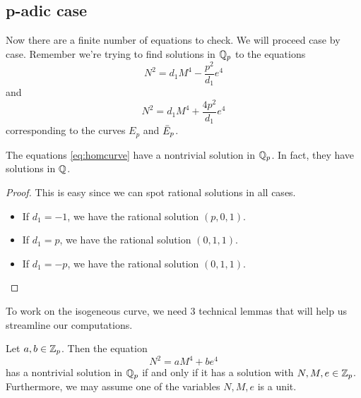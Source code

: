 \documentclass[12pt, a4paper]{report}
\begin{document}
\subsection{p-adic case}
Now there are a finite number of equations to check. We will proceed case by
case. Remember we're trying to find solutions in ${\mathbb Q}_p$ to the equations
\begin{equation} \label{eq:homcurve}
  N^2 = d_1 M^4 - \frac{p^2}{d_1}e^4
\end{equation}
and
\begin{equation} \label{eq:isocurve}
  N^2 = d_1 M^4 + \frac{4p^2}{d_1}e^4
\end{equation}
corresponding to the curves $E_p$ and $\bar{E}_p$.

\begin{thm}
  The equations \ref{eq:homcurve} have a nontrivial solution in ${\mathbb Q}_p$. In fact,
  they have solutions in ${\mathbb Q}$.
\end{thm}
\begin{proof} This is easy since we can spot rational solutions in all cases.
   
  \begin{itemize}
  \item If $d_1 = -1$, we have the rational solution $(p, 0, 1)$.
  \item If $d_1 = p$, we have the rational solution $(0, 1, 1)$.
  \item If $d_1 = -p$, we have the rational solution $(0, 1, 1)$.
  \end{itemize}
\end{proof}

To work on the isogeneous curve, we need 3 technical lemmas
that will help us streamline our computations.

\begin{lemma} \label{vanilla}
  Let $a, b \in {\mathbb Z}_p$. Then the equation 
  \begin{equation}
    \label{eq:multvanilla}
    N^2 = aM^4 + be^4
  \end{equation}
  has a nontrivial solution in ${\mathbb Q}_p$ if and only if it has a solution with
  $N, M, e \in {\mathbb Z}_p$. Furthermore, we may assume one of the variables $N, M, e$
  is a unit.
\end{lemma}
\end{document}
